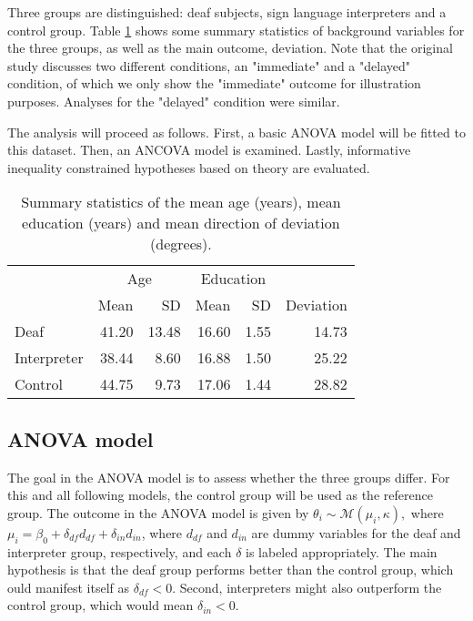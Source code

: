 \documentclass[11pt,a4paper]{article}\usepackage[]{graphicx}\usepackage[]{color}
\begin{document}
Three groups are distinguished: deaf subjects, sign language interpreters and a control group. Table \ref{ExampleDescrTable} shows some summary statistics of background variables for the three groups, as well as the main outcome, deviation. Note that the original study discusses two different conditions, an "immediate" and a "delayed" condition, of which we only show the "immediate" outcome for illustration purposes. Analyses for the "delayed" condition were similar.

The analysis will proceed as follows. First, a basic ANOVA model will be fitted to this dataset. Then, an ANCOVA model is examined. Lastly, informative inequality constrained hypotheses based on theory are evaluated.

\begin{table}[btp]
\centering
\caption{Summary statistics of the mean age (years), mean education (years) and mean direction of deviation (degrees).} 
\label{ExampleDescrTable}
\begin{tabular}{lrrrrr}
  \toprule & \multicolumn{2}{c}{Age} & \multicolumn{2}{c}{Education} &  \\  \cmidrule(lr){2-3} \cmidrule(lr){4-5}  & Mean & SD & Mean & SD & Deviation \\ 
  \midrule
Deaf & 41.20 & 13.48 & 16.60 & 1.55 & 14.73 \\ 
  Interpreter & 38.44 & 8.60 & 16.88 & 1.50 & 25.22 \\ 
  Control & 44.75 & 9.73 & 17.06 & 1.44 & 28.82 \\ 
   \bottomrule
\end{tabular}
\end{table}



\subsection{ANOVA model}



The goal in the ANOVA model is to assess whether the three groups differ. For this and all following models, the control group will be used as the reference group. The outcome in the ANOVA model is given by \( \theta_i \sim \mathcal{M}(\mu_i, \kappa), \) where \( \mu_i = \beta_0 + \delta_{df} d_{df} + \delta_{in} d_{in}\), where \( d_{df} \) and \( d_{in} \) are dummy variables for the deaf and interpreter group, respectively, and each \( \delta \) is labeled appropriately. The main hypothesis is that the deaf group performs better than the control group, which ould manifest itself as \( \delta_{df} < 0.\) Second, interpreters might also outperform the control group, which would mean \( \delta_{in} < 0.\)
\end{document}
